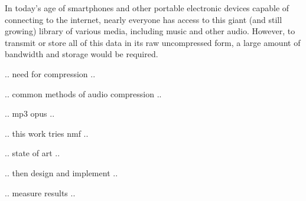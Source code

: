 In today's age of smartphones and other portable electronic devices capable of connecting to the internet, nearly everyone has access to this giant (and still growing) library of various media, including music and other audio. However, to transmit or store all of this data in its raw uncompressed form, a large amount of bandwidth and storage would be required.

.. need for compression ..

.. common methods of audio compression ..

.. mp3 opus ..

.. this work tries nmf ..

.. state of art ..

.. then design and implement ..

.. measure results ..
